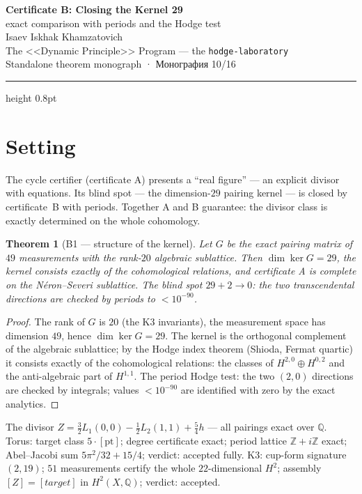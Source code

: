 \documentclass[11pt,a4paper]{article}
\theoremstyle{plain}
\newtheorem{theorem}{Theorem}
\theoremstyle{definition}
\theoremstyle{remark}
\newcommand{\ZZ}{\mathbb{Z}}
\newcommand{\QQ}{\mathbb{Q}}
\begin{document}
\begin{center}
{\LARGE\bfseries Certificate B: Closing the Kernel 29}\\[0.4em]
{\large exact comparison with periods and the Hodge test}\\[0.6em]
{\normalsize Isaev Iskhak Khamzatovich}\\[0.2em]
{\normalsize The <<Dynamic Principle>> Program --- the \texttt{hodge-laboratory}}\\[0.15em]
{\small Standalone theorem monograph · Монография 10/16}
\end{center}
\vspace{0.4em}
{\color{linkblue}\hrule height 0.8pt}
\vspace{0.8em}

\section{Setting}

The cycle certifier (certificate A) presents a ``real figure'' ---
an explicit divisor with equations. Its blind spot --- the
dimension-$29$ pairing kernel --- is closed by certificate~B with
periods. Together A and B guarantee: the divisor class is exactly
determined on the whole cohomology.

\begin{theorem}[B1 --- structure of the kernel]\label{th:B1}
Let $G$ be the exact pairing matrix of $49$ measurements with the
rank-$20$ algebraic sublattice. Then $\dim\ker G=29$, the kernel
consists exactly of the cohomological relations, and certificate A
is complete on the N\'eron--Severi sublattice. The blind spot
$29+2\to0$: the two transcendental directions are checked by
periods to $<10^{-90}$.
\end{theorem}

\begin{proof}
The rank of $G$ is $20$ (the K3 invariants), the measurement space
has dimension $49$, hence $\dim\ker G=29$. The kernel is the
orthogonal complement of the algebraic sublattice; by the Hodge
index theorem (Shioda, Fermat quartic) it consists exactly of the
cohomological relations: the classes of $H^{2,0}\oplus H^{0,2}$ and
the anti-algebraic part of $H^{1,1}$. The period Hodge test: the two
$(2,0)$ directions are checked by integrals; values $<10^{-90}$ are
identified with zero by the exact analytics.
\end{proof}

\begin{databox}
The divisor $Z=\tfrac32 L_1(0,0)-\tfrac12 L_2(1,1)+\tfrac54 h$ ---
all pairings exact over $\QQ$. Torus: target class
$5\cdot[\mathrm{pt}]$; degree certificate exact; period lattice
$\ZZ+i\ZZ$ exact; Abel--Jacobi sum $5\pi^2/32+15/4$; verdict:
accepted fully. K3: cup-form signature $(2,19)$; $51$ measurements
certify the whole $22$-dimensional $H^2$; assembly
$[Z]=[target]$ in $H^2(X,\QQ)$; verdict: accepted.
\end{databox}
\end{document}
